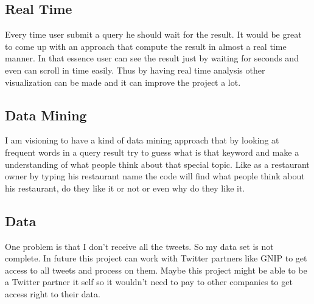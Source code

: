 \documentclass[a4paper,11pt]{report}
\begin{document}
\subsection{Real Time}

Every time user submit a query he should wait for the result. It would be great to come up with an approach that compute the result in almost a real time manner. In that essence user can see the result just by waiting for seconds and even can scroll in time easily. Thus by having real time analysis other visualization can be made and it can improve the project a lot.

\subsection{Data Mining}

I am visioning to have a kind of data mining approach that by looking at frequent words in a query result try to guess what is that keyword and make a understanding of what people think about that special topic. Like as a restaurant owner by typing his restaurant name the code will find what people think about his restaurant, do they like it or not or even why do they like it.

\subsection{Data}

One problem is that I don't receive all the tweets. So my data set is not complete. In future this project can work with Twitter partners like GNIP to get access to all tweets and process on them. Maybe this project might be able to be a Twitter partner it self so it wouldn't need to pay to other companies to get access right to their data.

\listoffigures
\end{document}
